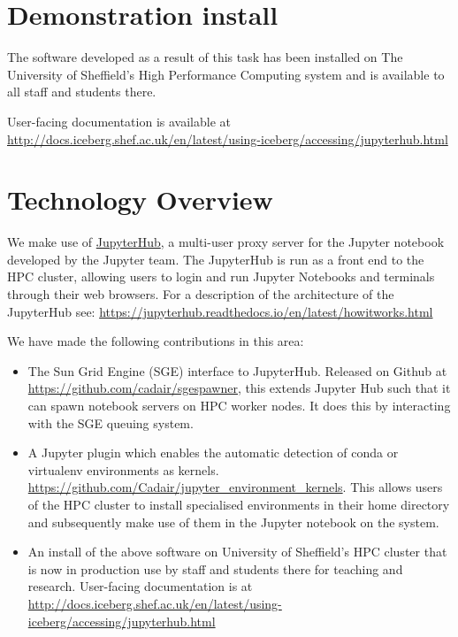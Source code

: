 \documentclass{deliverablereport}
\author{Stuart Mumford, Neil Lawrence \& Mike Croucher}
\begin{document}
\maketitle\vfill
\githubissuedescription
\newpage\tableofcontents\newpage

\section{Demonstration install}

The software developed as a result of this task has been installed on The University of Sheffield's High Performance Computing system and is available to all staff and students there. 

User-facing documentation is available at \url{http://docs.iceberg.shef.ac.uk/en/latest/using-iceberg/accessing/jupyterhub.html}

\section{Technology Overview}

We make use of \href{https://github.com/jupyterhub/jupyterhub}{JupyterHub}, a multi-user proxy server for the Jupyter notebook developed by the Jupyter team.
The JupyterHub is run as a front end to the HPC cluster, allowing users to login and run Jupyter Notebooks and terminals through their web browsers. For a description of the architecture of the JupyterHub see: \url{https://jupyterhub.readthedocs.io/en/latest/howitworks.html}

We have made the following contributions in this area:

\begin{itemize}
\item The Sun Grid Engine (SGE) interface to JupyterHub. Released on Github at \url{https://github.com/cadair/sgespawner}, this extends Jupyter Hub such that it can spawn notebook servers on HPC worker nodes. It does this by interacting with the SGE queuing system.
\item A Jupyter plugin which enables the automatic detection of conda or virtualenv environments as kernels. \url{https://github.com/Cadair/jupyter_environment_kernels}. This allows users of the HPC cluster to install specialised environments in their home directory and subsequently make use of them in the Jupyter notebook on the system.
\item An install of the above software on University of Sheffield's HPC cluster that is now in production use by staff and students there for teaching and research. User-facing documentation is at \url{http://docs.iceberg.shef.ac.uk/en/latest/using-iceberg/accessing/jupyterhub.html}
\end{itemize}
\end{document}
